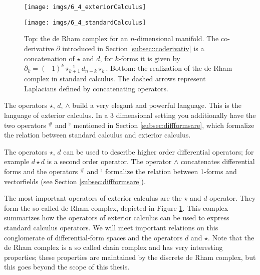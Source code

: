 \begin{figure}[t]
\begin{center}
\texttt{[image: imgs/6\_4\_exteriorCalculus]}

\texttt{[image: imgs/6\_4\_standardCalculus]}
\end{center}
\caption{Top: the de Rham complex for an $n$-dimensional manifold. The co-derivative $\partial$ introduced in Section \ref{subsec::coderivativ} is a concatenation of $\star$ and $d$, for $k$-forms it is given by $\partial_k = (-1)^k \star_{k+1}^{-1}d_{n-k}\star_k$. Bottom: the realization of the de Rham complex in standard calculus.  The dashed arrows represent Laplacians defined by concatenating operators.}
\label{fig::deRhamComplex}
\end{figure}

The operators $\star$, $d$, $\wedge$ build a very elegant and powerful language. This is the language of exterior calculus. In a 3 dimensional setting  you additionally have the two operators $^\#$ and $^\flat$ mentioned in Section \ref{subsec:diffformsare}, which formalize the relation between standard calculus and exterior calculus.

The operators $\star$, $d$ can be used to describe higher order differential operators; for example $d\star d$ is a second order operator.
The operator $\wedge$ concatenates differential forms and the operators $^\#$ and $^\flat$ formalize the relation between 1-forms and vectorfields (see Section \ref{subsec:diffformsare}).

The most important operators of exterior calculus are the $\star$ and $d$ operator. They form the so-called de Rham complex, depicted in Figure \ref{fig::deRhamComplex}. 
This complex summarizes how the operators of exterior calculus can be used to express standard calculus operators. We will meet important relations on this conglomerate of differential-form spaces and the operators $d$ and $\star$.
Note that the de Rham complex is a so called chain complex and has very interesting properties; these properties are maintained by the discrete de Rham complex, but this goes beyond the scope of this thesis. %

